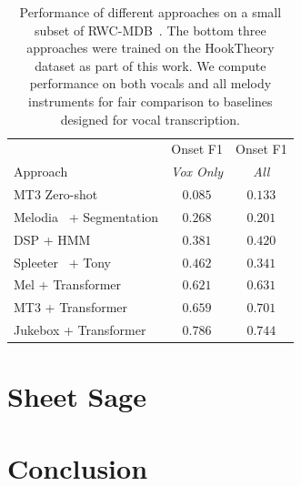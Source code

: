 \documentclass{article}
\newcommand{\mel}{Mel}
\newcommand{\mtthree}{MT3}
\newcommand{\jukebox}{Jukebox}
\newcommand{\hooktheory}{HookTheory}
\newcommand{\rwc}{RWC-MDB}
\begin{document}
\begin{table}[]
    \centering
    \begin{tabular}{lcc}
\toprule
 & Onset F1 & Onset F1 \\
Approach & \emph{Vox Only} & \emph{All} \\
\midrule
MT3 Zero-shot~\cite{gardner2021mt3} & $0.085$ & $0.133$ \\
Melodia~\cite{salamon2014melody} + Segmentation & $0.268$ & $0.201$ \\
DSP + HMM~\cite{ryynanen2006transcription,ryynanen2008automatic} & $0.381$ & $0.420$ \\
Spleeter~\cite{hennequin2020spleeter} + Tony~\cite{mauch2015computer} & $0.462$ & $0.341$ \\
\midrule
\mel{} + Transformer & $0.621$ & $0.631$ \\
\mtthree{} + Transformer & $0.659$ & $0.701$ \\
\jukebox{} + Transformer & $\mathbf{0.786}$ & $\mathbf{0.744}$ \\
\bottomrule
    \end{tabular}
    \caption{Performance of different approaches on a small subset of \rwc~\cite{goto2002rwc,goto2003rwc,goto2004development}. The bottom three approaches were trained on the \hooktheory{} dataset as part of this work. We compute performance on both vocals and all melody instruments for fair comparison to baselines designed for vocal transcription.}
    \label{tab:rwc_ryy}
\end{table}

\section{Sheet Sage}

\section{Conclusion}



\end{document}
